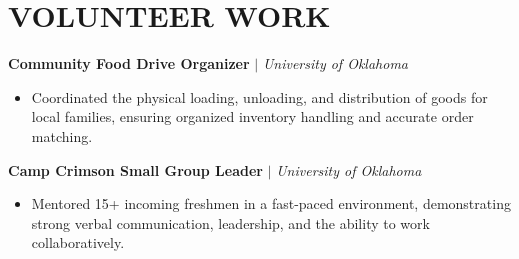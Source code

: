 \documentclass[11pt, letterpaper]{article}
\begin{document}
\section*{VOLUNTEER WORK}

\noindent \textbf{Community Food Drive Organizer} $|$ \textit{University of Oklahoma} 
\begin{itemize}[leftmargin=0.25in, label={$\bullet$}, itemsep=0pt, topsep=2pt]
    \item Coordinated the physical loading, unloading, and distribution of goods for local families, ensuring organized inventory handling and accurate order matching.
\end{itemize}

\vspace{2pt}

\noindent \textbf{Camp Crimson Small Group Leader} $|$ \textit{University of Oklahoma} 
\begin{itemize}[leftmargin=0.25in, label={$\bullet$}, itemsep=0pt, topsep=2pt]
    \item Mentored 15+ incoming freshmen in a fast-paced environment, demonstrating strong verbal communication, leadership, and the ability to work collaboratively.
\end{itemize}
\end{document}
